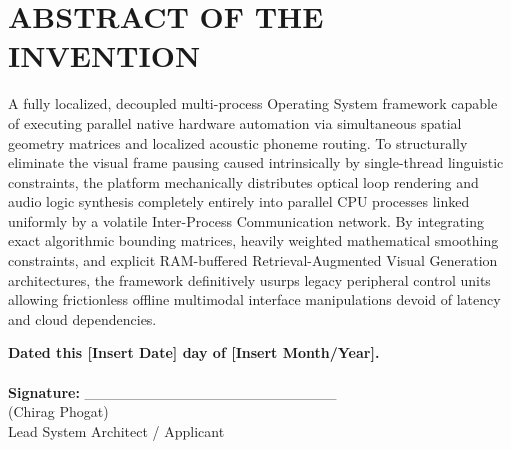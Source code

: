 \documentclass[12pt, a4paper]{article}
\begin{document}
\newpage

\section*{ABSTRACT OF THE INVENTION}
A fully localized, decoupled multi-process Operating System framework capable of executing parallel native hardware automation via simultaneous spatial geometry matrices and localized acoustic phoneme routing. To structurally eliminate the visual frame pausing caused intrinsically by single-thread linguistic constraints, the platform mechanically distributes optical loop rendering and audio logic synthesis completely entirely into parallel CPU processes linked uniformly by a volatile Inter-Process Communication network. By integrating exact algorithmic bounding matrices, heavily weighted mathematical smoothing constraints, and explicit RAM-buffered Retrieval-Augmented Visual Generation architectures, the framework definitively usurps legacy peripheral control units allowing frictionless offline multimodal interface manipulations devoid of latency and cloud dependencies.

\vspace{2cm}

\noindent \textbf{Dated this [Insert Date] day of [Insert Month/Year].} \\
\vspace{1cm} \\
\noindent \textbf{Signature:} \_\_\_\_\_\_\_\_\_\_\_\_\_\_\_\_\_\_\_\_\_\_\_\_ \\
\noindent (Chirag Phogat) \\
\noindent Lead System Architect / Applicant
\end{document}
